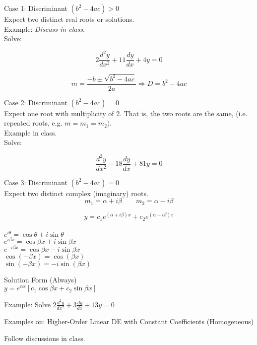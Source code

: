 \documentclass[10pt]{article}
\begin{document}
Case 1: Discriminant \((b^2-4ac) > 0\) \\

Expect two distinct real roots or solutions. \\

Example: \textit{Discuss in class.} \\

Solve:

\[2\frac{d^2y}{dx^2} + 11\frac{dy}{dx} + 4y = 0\]


\[m= \frac{-b\pm\sqrt{b^2-4ac}}{2a} \Rightarrow D = b^2-4ac\]


Case 2: Discriminant \((b^2-4ac) = 0\) \\

Expect one root with multiplicity of 2. That is, the two roots are the same, (i.e. repeated roots, e.g. \(m=m_1=m_2)\). \\

Example in class. \\

Solve:

\[\frac{d^2y}{dx^2} - 18 \frac{dy}{dx}+ 81y = 0 \]

\bigskip
\bigskip
\bigskip

Case 3: Discriminant \((b^2-4ac) = 0\) \\

Expect two distinct complex (imaginary) roots.
\[m_1 = \alpha + i\beta \qquad m_2 = \alpha - i\beta \]

\[y = c_1e^{(\alpha + i\beta)x} + c_2e^{(\alpha - i\beta)x}\] \\

\(e^{i\theta} = \cos\theta + i\sin\theta\) \\

\(e^{i\beta x} = \cos\beta x + i\sin\beta x\) \\

\(e^{-i\beta x} = \cos\beta x - i\sin\beta x\) \\

\(\cos(-\beta x) = \cos(\beta x) \) \\

\(\sin(-\beta x) = -i\sin(\beta x) \)

Solution Form (Always) \\

\(y = e^{\alpha x}[c_1 \cos \beta x + c_2 \sin \beta x] \) \\

\bigskip

Example: Solve \(2\frac{d^2 y}{dx^2} + 3\frac{dy}{dx} + 13y = 0\) \\

\bigskip

\bigskip 

Examples on: Higher-Order Linear DE with Constant Coefficients (Homogeneous) 

Follow discussions in class. 
\end{document}
